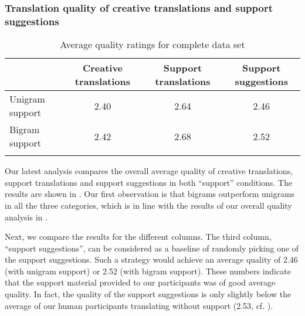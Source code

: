 \documentclass[output=paper]{LSP/langsci}
\begin{document}
\subsubsection{Translation quality of creative translations and support suggestions}
\label{sec:kremer:creative-support-quality}





\begin{table}[b]
  \begin{tabularx}{\textwidth}{QSSS}
    \lsptoprule
    & Creative translations 
    & Support translations
    & Support suggestions\\
    \midrule
    Unigram support & 2.40 & 2.64 & 2.46\\
    Bigram support & 2.42 & 2.68 & 2.52\\
    \lspbottomrule
  \end{tabularx}
  \caption{Average quality ratings for complete data set}
  \label{tab:creative-support-overall-quality}
\end{table}

Our latest analysis compares the overall average quality of creative
translations, support translations and support suggestions in both
``support'' conditions. 
%
The results are shown in . Our first
observation is that bigrams outperform unigrams in all the three
categories, which is in line with the results of our overall quality
analysis in .

Next, we compare the results for the different columns. The third
column, ``support suggestions'', can be considered as a baseline of
randomly picking one of the support suggestions. Such a strategy would
achieve an average quality of 2.46 (with unigram support) or 2.52
(with bigram support). These numbers indicate that the support
material provided to our participants was of good average quality. In
fact, the quality of the support suggestions is only slightly below
the average of our human participants translating without support
(2.53, cf. ).
\end{document}
